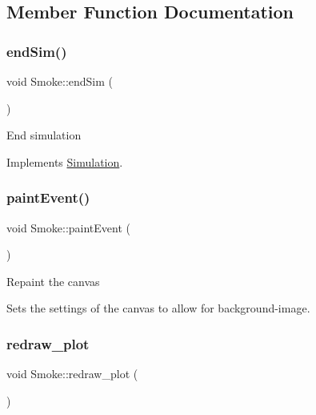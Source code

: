 \subsection{Member Function Documentation}
\mbox{\label{classSmoke_a83d3a0d8bf172fcd6bc42ebf07f0f12f}} 
\subsubsection{\texorpdfstring{endSim()}{endSim()}}
{\footnotesize\ttfamily void Smoke\+::end\+Sim (\begin{DoxyParamCaption}{ }\end{DoxyParamCaption})\hspace{0.3cm}{\ttfamily [virtual]}}

End simulation 

Implements \mbox{\hyperlink{classSimulation_ab496d124202f55e741db7db9a304a7ee}{Simulation}}.

\mbox{\label{classSmoke_af00f430e6cbe30b6caf841d7d1b05890}} 
\subsubsection{\texorpdfstring{paintEvent()}{paintEvent()}}
{\footnotesize\ttfamily void Smoke\+::paint\+Event (\begin{DoxyParamCaption}\item[{Q\+Paint\+Event $\ast$}]{ }\end{DoxyParamCaption})}

Repaint the canvas

Sets the settings of the canvas to allow for background-\/image. \mbox{\label{classSmoke_af856939211a558bf5dcd6feece65ad9d}} 
\subsubsection{\texorpdfstring{redraw\_plot}{redraw\_plot}}
{\footnotesize\ttfamily void Smoke\+::redraw\+\_\+plot (\begin{DoxyParamCaption}{ }\end{DoxyParamCaption})\hspace{0.3cm}{\ttfamily [slot]}}

